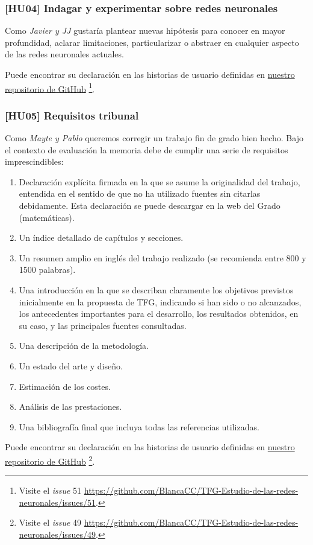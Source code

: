 \subsubsection*{ [HU04] Indagar y experimentar sobre redes neuronales} \label{HUO4}

Como \textit{Javier y JJ} gustaría plantear nuevas hipótesis para conocer en mayor profundidad, 
aclarar limitaciones, particularizar o abstraer en cualquier aspecto de las redes neuronales actuales.

Puede encontrar su declaración en las historias de usuario definidas en \href{https://github.com/BlancaCC/TFG-Estudio-de-las-redes-neuronales}{nuestro repositorio 
de GitHub} \footnote{Visite el \textit{issue} 51 \url{https://github.com/BlancaCC/TFG-Estudio-de-las-redes-neuronales/issues/51}.}.


\subsubsection*{[HU05] Requisitos tribunal} \label{HUO6}
Como \textit{Mayte y Pablo} queremos corregir un trabajo fin de grado bien hecho. 
Bajo el contexto de evaluación la memoria debe de cumplir una serie de requisitos imprescindibles:

\begin{enumerate}
    \item Declaración explícita firmada en la que se asume la originalidad del trabajo, entendida en el sentido de que no ha utilizado fuentes sin citarlas debidamente. Esta declaración se puede descargar en la web del Grado (matemáticas).
    \item Un índice detallado de capítulos y secciones.
    \item Un resumen amplio en inglés del trabajo realizado (se recomienda entre 800 y 1500 palabras).
    \item Una introducción en la que se describan claramente los objetivos previstos inicialmente en la propuesta de TFG, indicando si han sido o no alcanzados, los antecedentes importantes para el desarrollo, los resultados obtenidos, en su caso, y las principales fuentes consultadas.
    \item Una descripción de la metodología.
    \item Un estado del arte y diseño.
    \item Estimación de los costes.
    \item Análisis de las prestaciones.
    \item Una bibliografía final que incluya todas las referencias utilizadas.
\end{enumerate}
Puede encontrar su declaración en las historias de usuario definidas en \href{https://github.com/BlancaCC/TFG-Estudio-de-las-redes-neuronales}{nuestro repositorio 
de GitHub} \footnote{Visite el \textit{issue} 49 \url{https://github.com/BlancaCC/TFG-Estudio-de-las-redes-neuronales/issues/49}.}.

